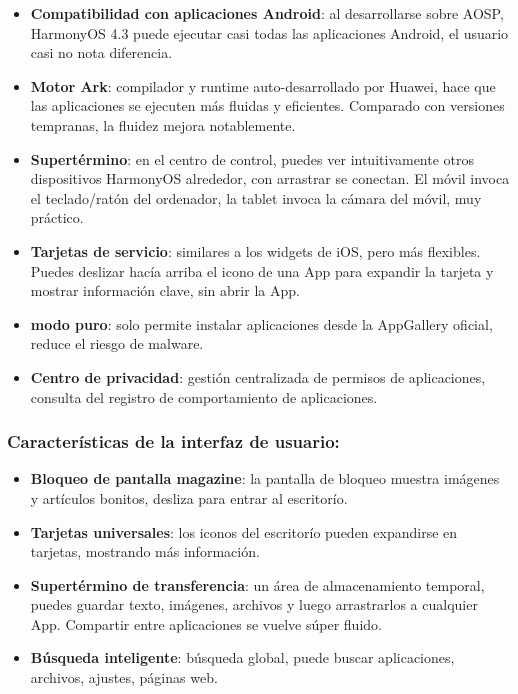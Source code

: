 \begin{itemize}
  \item \textbf{Compatibilidad con aplicaciones Android}: al desarrollarse sobre AOSP, HarmonyOS 4.3 puede ejecutar casi todas las aplicaciones Android, el usuario casi no nota diferencia.
  \item \textbf{Motor Ark}: compilador y runtime auto-desarrollado por Huawei, hace que las aplicaciones se ejecuten más fluidas y eficientes. Comparado con versiones tempranas, la fluidez mejora notablemente.
  \item \textbf{Supertérmino}: en el centro de control, puedes ver intuitivamente otros dispositivos HarmonyOS alrededor, con arrastrar se conectan. El móvil invoca el teclado/ratón del ordenador, la tablet invoca la cámara del móvil, muy práctico.
  \item \textbf{Tarjetas de servicio}: similares a los widgets de iOS, pero más flexibles. Puedes deslizar hacía arriba el icono de una App para expandir la tarjeta y mostrar información clave, sin abrir la App.
  \item \textbf{modo puro}: solo permite instalar aplicaciones desde la AppGallery oficial, reduce el riesgo de malware.
  \item \textbf{Centro de privacidad}: gestión centralizada de permisos de aplicaciones, consulta del registro de comportamiento de aplicaciones.
\end{itemize}

\subsubsection*{Características de la interfaz de usuario:}

\begin{itemize}
  \item \textbf{Bloqueo de pantalla magazine}: la pantalla de bloqueo muestra imágenes y artículos bonitos, desliza para entrar al escritorío.
  \item \textbf{Tarjetas universales}: los iconos del escritorío pueden expandirse en tarjetas, mostrando más información.
  \item \textbf{Supertérmino de transferencia}: un área de almacenamiento temporal, puedes guardar texto, imágenes, archivos y luego arrastrarlos a cualquier App. Compartir entre aplicaciones se vuelve súper fluido.
  \item \textbf{Búsqueda inteligente}: búsqueda global, puede buscar aplicaciones, archivos, ajustes, páginas web.
\end{itemize}

